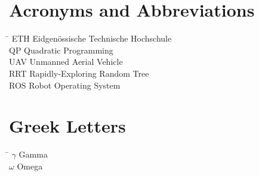 \section*{Acronyms and Abbreviations}
\begin{tabbing}
 \hspace*{1.6cm}  \= \kill
 ETH \> Eidgen\"{o}ssische Technische Hochschule \\[0.5ex]
 QP \>  Quadratic Programming\\[0.5ex]
 UAV \> Unmanned Aerial Vehicle \\[0.5ex]
RRT \> Rapidly-Exploring Random Tree\\[0.5ex]
ROS \> Robot Operating System\\[0.5ex]
\end{tabbing}

\section*{Greek Letters}
\begin{tabbing}
 \hspace*{1.6cm}  \= \kill
$\gamma$ \> Gamma \\[0.5ex]
$\omega$ \> Omega \\[0.5ex]
\end{tabbing}

 \cleardoublepage

